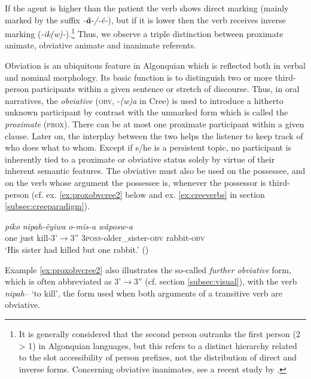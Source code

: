 \documentclass[twoside,a4paper,11pt]{article}
\newcommand{\ipa}[1]{{\phon\textit{#1}}}
\newcommand{\obv}{\textsc{obv}}
\newcommand{ \prox}{\textsc{prox}}
\begin{document}
If the agent is higher than the patient the verb shows direct marking (mainly marked by the suffix \ipa{-\textbf{â}-/-ê-}), but if it is lower then the verb receives inverse marking (\ipa{-ik(w)-}).\footnote{It is generally considered that the second person outranks the first person (2 > 1) in Algonquian languages, but this refers to a distinct hierarchy related to the slot accessibility of person prefixes, not the distribution of direct and inverse forms. Concerning obviative inanimates, see a recent study by \citet{muehlbauer12obviation}.} Thus, we observe a triple distinction between proximate animate, obviative animate and inanimate referents.

Obviation is an ubiquitous feature in Algonquian which is reflected both in verbal and nominal morphology. Its basic function is to distinguish two or more third-person participants within a given sentence or stretch of discourse. Thus, in oral narratives, the \textit{obviative} (\obv, -\textit{(w)a} in Cree) is used to introduce a hitherto unknown participant by contrast with the unmarked form which is called the \textit{proximate} (\prox). There can be  at most one proximate participant within a given clause. Later on, the interplay between the two helps the listener to keep track of who does what to whom. Except if s/he is a persistent topic, no participant is inherently tied to a proximate or obviative status solely by virtue of their inherent semantic features. The obviative must also be used on the possessee, and on the verb whose argument the possessee is, whenever the possessor is third-person (cf. ex. \ref{ex:proxobvcree2} below and ex. \ref{ex:creeverbs} in section \ref{subsec:creeparadigm}).

\begin{exe}
\ex \label{ex:proxobvcree2}
\gll \ipa{pêyak}  \ipa{piko}	\ipa{nipah-êyiwa}  \ipa{o-mis-a} \ipa{wâposw-a}  \\
one just kill-3'$\rightarrow$3''  3\textsc{poss}-older\_sister-\textsc{obv} rabbit-\textsc{obv}\\
\glt  `His sister had killed but one rabbit.'  (\citealp[p. 401]{wolfart96sketch})
\end{exe}

Example \ref{ex:proxobvcree2} also illustrates the so-called \textit{further obviative} form, which is often abbreviated as 3'$\rightarrow$3'' (cf. section \ref{subsec:visual}), with the verb \ipa{nipah--} `to kill', the form used when both arguments of a transitive verb are obviative.
\end{document}
